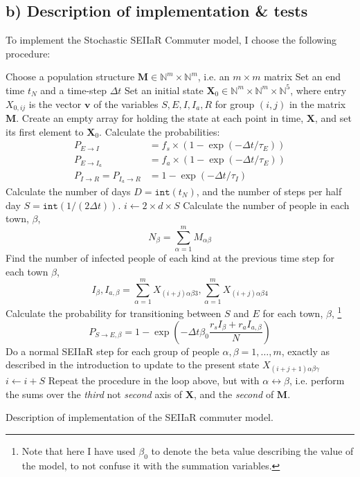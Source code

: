 \subsection{b) Description of implementation \& tests} 

To implement the Stochastic SEIIaR Commuter model, I choose the following procedure: 

\begin{algorithm}[H]
	Choose a population structure $\mathbf{M} \in \mathbb{N}^m \times \mathbb{N}^m$, i.e. an $m\times m$ matrix\;  
	Set an end time $t_N$ and a time-step $\Delta t$\;
	Set an initial state $\mathbf{X}_0 \in \mathbb{N}^m \times \mathbb{N}^m \times \mathbb{N}^5$, where entry $X_{0,ij}$ is the vector $\mathbf{v}$ of the variables $S,E,I,I_a,R$ for group $(i,j)$ in the matrix $\mathbf{M}$.\;
	Create an empty array for holding the state at each point in time, $\mathbf{X}$, and set its first element to $\mathbf{X}_0$.\;
	Calculate the probabilities:
	\begin{align*}
		P_{E\to I} &= f_s \times (1 - \exp{(-\Delta t/\tau_E)}) \\
		P_{E\to I_a} &= f_a \times (1 - \exp{(-\Delta t/\tau_E)}) \\
		P_{I\to R} = P_{I_a\to R} &= 1 - \exp{(-\Delta t/\tau_I)} 
	\end{align*}
	Calculate the number of days $D = \texttt{int}(t_N)$, and the number of steps per half day $S = \texttt{int}(1/(2\Delta t))$.\; 
		{
		$i \gets 2 \times d \times S$\;
			{
			Calculate the number of people in each town, $\beta$,
				$$
				N_\beta = \sum_{\alpha = 1}^{m} M_{\alpha \beta} 
				$$ 
			Find the number of infected people of each kind at the previous time step for each town $\beta$,
				$$
				I_{\beta}, I_{a,\beta} = \sum_{\alpha = 1}^{m} X_{(i+j)\alpha\beta3},  \sum_{\alpha = 1}^{m} X_{(i+j)\alpha\beta4} 
				$$
			Calculate the probability for transitioning between $S$ and $E$ for each town, $\beta$, \footnote{Note that here I have used $\beta_0$ to denote the beta value describing the value of the model, to not confuse it with the summation variables.}
				$$
				P_{S\to E,\beta} = 1 - \exp{\left( - \Delta t \beta_0 \frac{r_s I_{\beta} + r_a I_{a,\beta}}{N}\right)} 
				$$
			}
			Do a normal SEIIaR step for each group of people $\alpha,\beta = 1,\dots,m$, exactly as described in the introduction to update to the present state $X_{(i+j+1)\alpha\beta\gamma}$\;   
		$i \gets i + S$\;
			{
			Repeat the procedure in the loop above, but with $\alpha \leftrightarrow \beta$, i.e. perform the sums over the \textit{third} not \textit{second} axis of $\mathbf{X}$, and the \textit{second} of $\mathbf{M}$. \;
			}
		}
		\caption{Description of implementation of the SEIIaR commuter model.}
\end{algorithm} 

